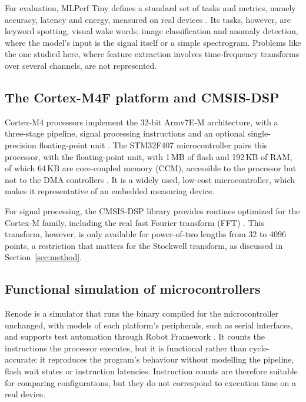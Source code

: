 \documentclass[11pt,a4paper]{article}
\begin{document}
For evaluation, MLPerf Tiny defines a standard set of tasks and metrics, namely accuracy, latency and energy, measured on real devices \citep{banbury_mlperf}. Its tasks, however, are keyword spotting, visual wake words, image classification and anomaly detection, where the model's input is the signal itself or a simple spectrogram. Problems like the one studied here, where feature extraction involves time-frequency transforms over several channels, are not represented.

\subsection{The Cortex-M4F platform and CMSIS-DSP}
Cortex-M4 processors implement the 32-bit Armv7E-M architecture, with a three-stage pipeline, signal processing instructions and an optional single-precision floating-point unit \citep{arm_cm4}. The STM32F407 microcontroller pairs this processor, with the floating-point unit, with 1\,MB of flash and 192\,KB of RAM, of which 64\,KB are core-coupled memory (CCM), accessible to the processor but not to the DMA controllers \citep{st_rm0090}. It is a widely used, low-cost microcontroller, which makes it representative of an embedded measuring device.

For signal processing, the CMSIS-DSP library provides routines optimized for the Cortex-M family, including the real fast Fourier transform (FFT) \citep{arm_cmsisdsp}. This transform, however, is only available for power-of-two lengths from 32 to 4096 points, a restriction that matters for the Stockwell transform, as discussed in Section~\ref{sec:method}.

\subsection{Functional simulation of microcontrollers}
Renode is a simulator that runs the binary compiled for the microcontroller unchanged, with models of each platform's peripherals, such as serial interfaces, and supports test automation through Robot Framework \citep{renode}. It counts the instructions the processor executes, but it is functional rather than cycle-accurate: it reproduces the program's behaviour without modelling the pipeline, flash wait states or instruction latencies. Instruction counts are therefore suitable for comparing configurations, but they do not correspond to execution time on a real device.
\end{document}
